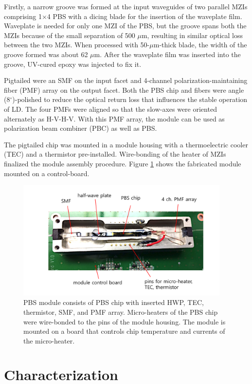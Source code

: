\documentclass[letterpaper, 10pt]{article}
\begin{document}
Firstly, a narrow groove was formed at the input waveguides of two parallel MZIs comprising 1$\times$4 PBS with a dicing blade for the insertion of the waveplate film.
Waveplate is needed for only one MZI of the PBS, but the groove spans  both the MZIs because of the small separation of 500 $\mu$m, resulting in similar optical loss between the two MZIs.
When processed with 50-$\mu$m-thick blade, the width of the groove formed was about 62 $\mu$m.
After the waveplate film was inserted into the groove, UV-cured epoxy was injected to fix it.

Pigtailed were an SMF on the input facet and 4-channel polarization-maintaining fiber (PMF) array on the output facet.
Both the PBS chip and fibers were angle (8$^\circ$)-polished to reduce the optical return loss that influences the stable operation of LD.
The four PMFs were aligned so that the slow-axes  were oriented alternately as H-V-H-V.
With this PMF array, the module can be used as polarization beam combiner (PBC) as well as PBS.

The pigtailed chip was mounted in a module housing with a thermoelectric cooler (TEC) and a thermistor pre-installed.
Wire-bonding of the heater of MZIs finalized the module assembly procedure.
Figure \ref{fig:module} shows the fabricated module mounted on a control-board.
\begin{figure}
  \centering
  \includegraphics[height=6cm]{module.pdf}
  \caption{PBS module consists of PBS chip with inserted HWP, TEC, thermistor, SMF, and PMF array. Micro-heaters of the PBS chip were wire-bonded to the pins of the module housing. The module is mounted on a board that controls chip temperature and currents of the micro-heater.}
  \label{fig:module}
\end{figure}

\section{Characterization}
\end{document}
